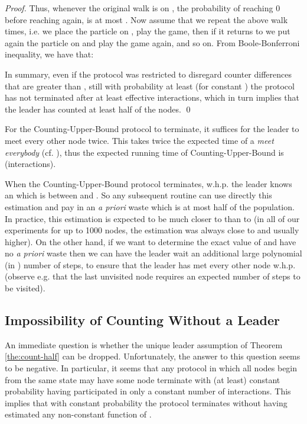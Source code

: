 \documentclass[oribibl, 11pt]{llncs}
\begin{document}
\begin{proof}
Thus, whenever the original walk is on , the probability of reaching 0 before reaching  again, is at most . Now assume that we repeat the above walk  times, i.e. we place the particle on , play the game, then if it returns to  we put again the particle on  and play the game again, and so on. From Boole-Bonferroni inequality, we have that:



In summary, even if the protocol was restricted to disregard counter differences that are greater than , still with probability at least  (for constant ) the protocol has not terminated after at least  effective interactions, which in turn implies that the leader has counted at least half of the nodes.
\qed
\end{proof}

\begin{remark}
For the Counting-Upper-Bound protocol to terminate, it suffices for the leader to meet every other node twice. This takes twice the expected time of a \emph{meet everybody} (cf. \cite{MS14}), thus the expected running time of Counting-Upper-Bound is  (interactions). 
\end{remark}

\begin{remark}
When the Counting-Upper-Bound protocol terminates, w.h.p. the leader knows an  which is between  and . So any subsequent routine can use directly this estimation and pay in an \emph{a priori} waste which is at most half of the population. In practice, this estimation is expected to be much closer to  than to  (in all of our experiments for up to 1000 nodes, the estimation was always close to  and usually higher). On the other hand, if we want to determine the exact value of  and have no \emph{a priori} waste then we can have the leader wait an additional large polynomial (in ) number of steps, to ensure that the leader has met every other node w.h.p. (observe e.g. that the last unvisited node requires an expected number of  steps to be visited).
\end{remark}

\subsection{Impossibility of Counting Without a Leader}
\label{subsec:impossibility}

An immediate question is whether the unique leader assumption of Theorem \ref{the:count-half} can be dropped. Unfortunately, the answer to this question seems to be negative. In particular, it seems that any protocol in which all nodes begin from the same state may have some node terminate with (at least) constant probability having participated in only a constant number of interactions. This implies that with constant probability the protocol terminates without having estimated any non-constant function of .
\end{document}
